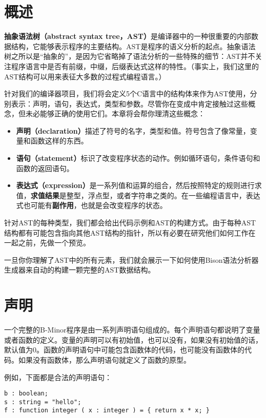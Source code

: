 \documentclass[cn,11pt,chinese]{elegantbook}
\begin{document}
\section{概述}

\textbf{抽象语法树（abstract syntax tree，AST）}是编译器中的一种很重要的内部数据结构，它能够表示程序的主要结构。AST是程序的语义分析的起点。抽象语法树之所以是“抽象的”，是因为它省略掉了语法分析的一些特殊的细节：AST并不关注程序语言中是否有前缀，中缀，后缀表达式这样的特性。（事实上，我们这里的AST结构可以用来表征大多数的过程式编程语言。）

针对我们的编译器项目，我们将会定义5个C语言中的结构体来作为AST使用，分别表示：声明，语句，表达式，类型和参数。尽管你在变成中肯定接触过这些概念，但未必能够正确的使用它们。本章将会帮你理清这些概念：

\begin{itemize}
  \item \textbf{声明（declaration）}描述了符号的名字，类型和值。符号包含了像常量，变量和函数这样的东西。
  \item \textbf{语句（statement）}标识了改变程序状态的动作。例如循环语句，条件语句和函数的返回语句。
  \item \textbf{表达式（expression）}是一系列值和运算的组合，然后按照特定的规则进行求值，\textbf{求值结果}是整型，浮点型，或者字符串之类的。在一些编程语言中，表达式也可能有\textbf{副作用}，也就是会改变程序的状态。
\end{itemize}

针对AST的每种类型，我们都会给出代码示例和AST的构建方式。由于每种AST结构都有可能包含指向其他AST结构的指针，所以有必要在研究他们如何工作在一起之前，先做一个预览。

一旦你你理解了AST中的所有元素，我们就会展示一下如何使用Bison语法分析器生成器来自动的构建一颗完整的AST数据结构。

\section{声明}

一个完整的B-Minor程序是由一系列声明语句组成的。每个声明语句都说明了变量或者函数的定义。变量的声明可以有初始值，也可以没有，如果没有初始值的话，默认值为0。函数的声明语句中可能包含函数体的代码，也可能没有函数体的代码。如果没有函数体，那么声明语句就定义了函数的原型。

例如，下面都是合法的声明语句：

\begin{verbatim}
b : boolean;
s : string = "hello";
f : function integer ( x : integer ) = { return x * x; }
\end{verbatim}
\end{document}
